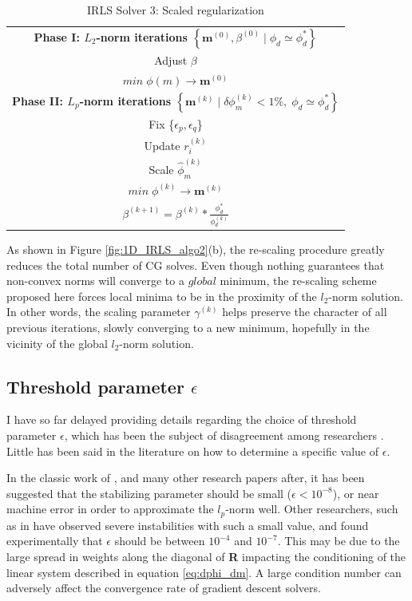 \begin{table}[h!]
\centering
\caption{IRLS Solver 3: Scaled regularization}
\label{tbl:IRLS_v3}
\renewcommand{\arraystretch}{1.5}
\begin{tabular}{|c|}\hline
\textbf{Phase I: $L_2$-norm iterations  $\left\{ \mathbf{m}^{(0)}, \beta^{(0)} \mid \phi_d \simeq \phi_d^* \right \}$}\\
Adjust $\beta$ \\
$min\; \phi(m)  \rightarrow \mathbf{m}^{(0)}$ \\ \hline
\textbf{Phase II: $L_p$-norm iterations $\left\{  \mathbf{m}^{(k)} \mid \delta \phi_m^{(k)} < 1\%,\; \phi_d \simeq \phi_d^* \right \}$ }\\
Fix \{$\epsilon_p,\epsilon_q$\}\\
Update $r_i^{(k)}$\\
Scale $\hat \phi_m^{(k)}$ \\
$min\; \phi^{(k)}  \rightarrow \mathbf{m}^{(k)}$\\ 
$\beta^{(k+1)}=\beta^{(k)} *\frac{\phi_d^*}{\phi_d^{(k)}} $\\ \hline
\end{tabular}
\end{table}
As shown in Figure \ref{fig:1D_IRLS_algo2}(b), the re-scaling procedure greatly reduces the total number of CG solves. 
Even though nothing guarantees that non-convex norms will converge to a $global$ minimum, the re-scaling scheme proposed here forces local minima to be in the proximity of the $l_2$-norm solution.
In other words, the scaling parameter $\gamma^{(k)}$ helps preserve the character of all previous iterations, slowly converging to a new minimum, hopefully in the vicinity of the global $l_2$-norm solution.

\subsection{Threshold parameter $\epsilon$}\label{eps_algo}
I have so far delayed providing details regarding the choice of threshold parameter $\epsilon$, which has been the subject of disagreement among researchers \cite[]{LastKubik83, BarbosaSilva94, Ajo-Franklin07, Stocco09, SunLi14}.  
Little has been said in the literature on how to determine a specific value of $\epsilon$.

In the classic work of \cite{LastKubik83}, and many other research papers after, it has been suggested that the stabilizing parameter should be small ($\epsilon < 10^{-8}$), or near machine error in order to approximate the $l_p$-norm well. 
Other researchers, such as in \cite{Ajo-Franklin07} have observed severe instabilities with such a small value, and found experimentally that $\epsilon$ should be between $10^{-4}$ and $10^{-7}$.
This may be due to the large spread in weights along the diagonal of \textbf{R} impacting the conditioning of the linear system described in equation \eqref{eq:dphi_dm}. A large condition number can adversely affect the convergence rate of gradient descent solvers.

